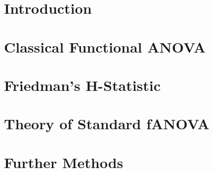 \documentclass[11pt,compress,t,notes=noshow, aspectratio=169, xcolor=table]{beamer}
\begin{document}


%
\section{Introduction}


\section{Classical Functional ANOVA}


\section{Friedman’s H-Statistic}


\section{Theory of Standard fANOVA}


\section{Further Methods}

\end{document}
